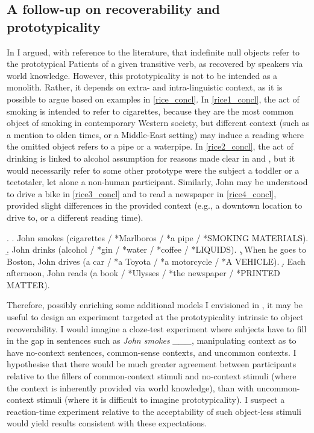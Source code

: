 \subsection{A follow-up on recoverability and prototypicality}

In  I argued, with reference to the literature, that indefinite null objects refer to the prototypical Patients of a given transitive verb, as recovered by speakers via world knowledge. However, this prototypicality is not to be intended as a monolith. Rather, it depends on extra- and intra-linguistic context, as it is possible to argue based on  examples in \ref{rice_concl}. In \ref{rice1_concl}, the act of smoking is intended to refer to cigarettes, because they are the most common object of smoking in contemporary Western society, but different context (such as a mention to olden times, or a Middle-East setting) may induce a reading where the omitted object refers to a pipe or a waterpipe. In \ref{rice2_concl}, the act of drinking is linked to alcohol assumption for reasons made clear in  and , but it would necessarily refer to some other prototype were the subject a toddler or a teetotaler, let alone a non-human participant. Similarly, John may be understood to drive a bike in \ref{rice3_concl} and to read a newspaper in \ref{rice4_concl}, provided slight differences in the provided context (e.g., a downtown location to drive to, or a different reading time).

\ex. \label{rice_concl} \a. \label{rice1_concl} John smokes (cigarettes / *Marlboros / *a pipe / *SMOKING MATERIALS).
\b. \label{rice2_concl} John drinks (alcohol / *gin / *water / *coffee / *LIQUIDS).
\c. \label{rice3_concl} When he goes to Boston, John drives (a car / *a Toyota / *a motorcycle / *A VEHICLE).
\d. \label{rice4_concl} Each afternoon, John reads (a book / *Ulysses / *the newspaper / *PRINTED MATTER).

Therefore, possibly enriching some additional models I envisioned in , it may be useful to design an experiment targeted at the prototypicality intrinsic to object recoverability. I would imagine a cloze-test experiment where subjects have to fill in the gap in sentences such as \textit{John smokes \_\_\_}, manipulating context as to have no-context sentences, common-sense contexts, and uncommon contexts. I hypothesise that there would be much greater agreement between participants relative to the fillers of common-context stimuli and no-context stimuli (where the context is inherently provided via world knowledge), than with uncommon-context stimuli (where it is difficult to imagine prototypicality). I suspect a reaction-time experiment relative to the acceptability of such object-less stimuli would yield results consistent with these expectations.